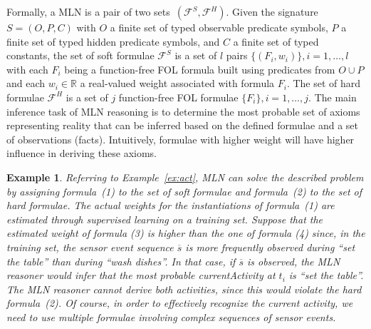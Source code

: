 \documentclass[10pt, conference, compsocconf]{IEEEtran}
\newtheorem{example}{Example}
\begin{document}
Formally, a MLN is a pair of two sets~$(\mathcal{F}^S,\mathcal{F}^H)$. Given the signature $S=(O, P, C)$ with $O$ a finite set of typed observable predicate symbols, $P$ a finite set of typed hidden predicate symbols, and $C$ a finite set of typed constants, the set of soft formulae $\mathcal{F}^S$ is a set of $l$ pairs $\{(F_i, w_i)\}, i=1,\ldots,l$ with each $F_i$ being a function-free FOL formula built using predicates from $O \cup P$ and each $w_i \in \mathbb{R}$ a real-valued weight associated with formula $F_i$. The set of hard formulae $\mathcal{F}^H$ is a set of $j$ function-free FOL formulae $\{F_i\}, i=1,\ldots,j$. 
The main inference task of MLN reasoning is to determine the most probable set
of axioms representing reality that can be inferred based 
on the defined formulae and a set of observations (facts).
Intuitively, formulae with higher weight will have higher influence in 
deriving these axioms. 


\begin{example}
Referring to Example~\ref{ex:act}, MLN can solve the described problem by assigning 
formula~(1) to the set of soft formulae and formula~(2) to the set of hard formulae. 
The actual weights for the instantiations of formula~(1) are estimated through supervised learning on a training set. 
Suppose that the estimated weight of formula (3) is higher than the one of 
formula (4) since, in the training set, the sensor event sequence $\overline{s}$  
is more frequently observed during ``set the table'' than during ``wash dishes''. 
In that case, if $\overline{s}$ is observed, the MLN reasoner would infer that the most 
probable \emph{currentActivity} at $t_i$ is ``set the table''. 
The MLN reasoner cannot derive both activities, since this would violate the hard 
formula~(2). 
Of course, in order to effectively recognize the current activity, we need to use 
multiple formulae involving complex sequences of sensor events.
\end{example}
\end{document}
